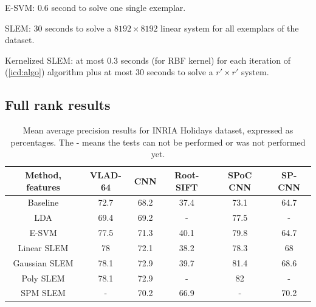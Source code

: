 E-SVM: $0.6$ second to solve one single exemplar.

SLEM: $30$ seconds to solve a $8192\times 8192$ linear system for all exemplars of the dataset.

Kernelized SLEM: at most $0.3$ seconds (for RBF kernel) for each iteration of (\ref{icd:algo}) algorithm plus at most $30$ seconds to solve a $r'\times r'$ system.


\subsection{Full rank results}

\begin{table}[t]
\begin{center}
\begin{tabular}{|c|c|c|c|c|c|}
\hline
Method, features & VLAD-64 \cite{VLAD}& CNN \cite{jia2014caffe} & Root-SIFT \cite{3things} & SPoC CNN \cite{babenko15} &  SP-CNN \cite{SPPCNN} \\
\hline\hline
Baseline            & 72.7 & 68.2 & 37.4 & 73.1 & 64.7\\
LDA                 & 69.4 & 69.2 & -    & 77.5 & -\\
E-SVM               & 77.5 & 71.3 & 40.1 & 79.8 & 64.7 \\
Linear SLEM         & 78   & 72.1 & 38.2 & 78.3 & 68 \\
Gaussian SLEM       & 78.1 & 72.9 & 39.7 & 81.4 & 68.6 \\
Poly SLEM           & 78.1 & 72.9 & -    & 82   &   -   \\
SPM SLEM            & -    & 70.2 & 66.9 & -    & 70.2 \\
\hline
\end{tabular}
\end{center}
\caption{Mean average precision results for INRIA Holidays dataset, expressed as percentages. The - means the tests can not be performed or was not performed yet.}
\end{table}


